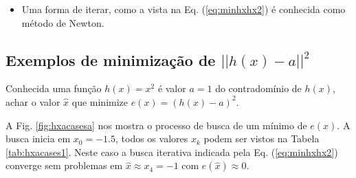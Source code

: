 \begin{tcbattention}
\begin{itemize}
\item Uma forma de iterar, como a vista na Eq. (\ref{eq:minhxhx2}) é conhecida como método de Newton.
\end{itemize}
\end{tcbattention}


\subsection{Exemplos de minimização de $||h(x)-a||^2$}


\begin{example}\label{ex:minhxhx1}
Conhecida uma função $h(x)=x^2$ é valor $a=1$ do contradomínio de $h(x)$,
achar o valor $\hat{x}$ que minimize $e(x)=(h(x)-a)^2$.
\end{example}
\begin{SolutionT}\label{sol:minhxhx1}
 A Fig. \ref{fig:hxacasesa} nos mostra o processo de busca de um mínimo de $e(x)$. 
A busca inicia em $x_0=-1.5$, 
todos os valores $x_{k}$ podem ser vistos na
Tabela \ref{tab:hxacases1}. 
Neste caso a busca iterativa indicada pela Eq. (\ref{eq:minhxhx2}) converge sem problemas em $\hat{x}\approx x_4=-1$ com $e(\hat{x})\approx 0$.
\end{SolutionT}

